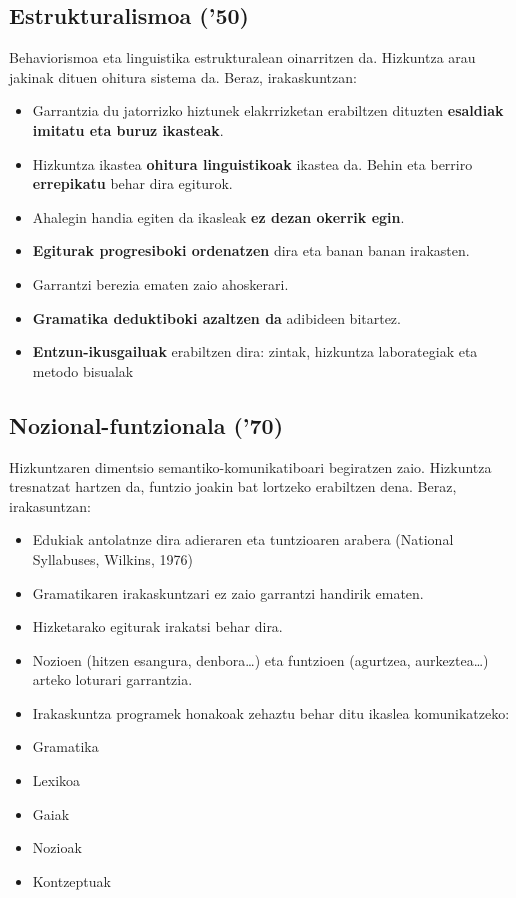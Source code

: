 \documentclass[]{book}
\providecommand{\tightlist}{%
  \setlength{\itemsep}{0pt}\setlength{\parskip}{0pt}}
\begin{document}
\hypertarget{estrukturalismoa-50}{%
\subsection{Estrukturalismoa ('50)}\label{estrukturalismoa-50}}

Behaviorismoa eta linguistika estrukturalean oinarritzen da. Hizkuntza arau jakinak dituen ohitura sistema da. Beraz, irakaskuntzan:

\begin{itemize}
\tightlist
\item
  Garrantzia du jatorrizko hiztunek elakrrizketan erabiltzen dituzten \textbf{esaldiak imitatu eta buruz ikasteak}.
\item
  Hizkuntza ikastea \textbf{ohitura linguistikoak} ikastea da. Behin eta berriro \textbf{errepikatu} behar dira egiturok.
\item
  Ahalegin handia egiten da ikasleak \textbf{ez dezan okerrik egin}.
\item
  \textbf{Egiturak progresiboki ordenatzen} dira eta banan banan irakasten.
\item
  Garrantzi berezia ematen zaio ahoskerari.
\item
  \textbf{Gramatika deduktiboki azaltzen da} adibideen bitartez.
\item
  \textbf{Entzun-ikusgailuak} erabiltzen dira: zintak, hizkuntza laborategiak eta metodo bisualak
\end{itemize}

\hypertarget{nozional-funtzionala-70}{%
\subsection{Nozional-funtzionala ('70)}\label{nozional-funtzionala-70}}

Hizkuntzaren dimentsio semantiko-komunikatiboari begiratzen zaio. Hizkuntza tresnatzat hartzen da, funtzio joakin bat lortzeko erabiltzen dena. Beraz, irakasuntzan:

\begin{itemize}
\tightlist
\item
  Edukiak antolatnze dira adieraren eta tuntzioaren arabera (National Syllabuses, Wilkins, 1976)
\item
  Gramatikaren irakaskuntzari ez zaio garrantzi handirik ematen.
\item
  Hizketarako egiturak irakatsi behar dira.
\item
  Nozioen (hitzen esangura, denbora\ldots{}) eta funtzioen (agurtzea, aurkeztea\ldots{}) arteko loturari garrantzia.
\item
  Irakaskuntza programek honakoak zehaztu behar ditu ikaslea komunikatzeko:
\item
  Gramatika
\item
  Lexikoa
\item
  Gaiak
\item
  Nozioak
\item
  Kontzeptuak
\end{itemize}
\end{document}
